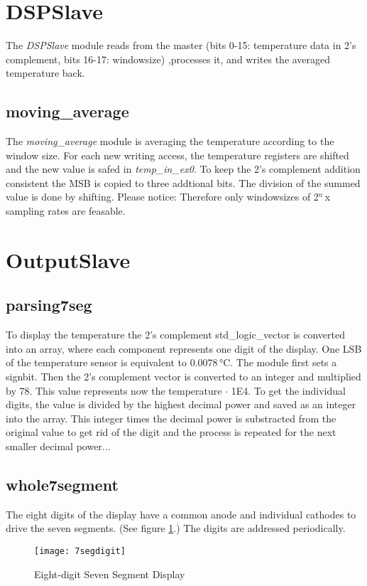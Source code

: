 \documentclass[%
	a4paper,
]
{article}
\begin{document}
\section{DSPSlave}
The \textit{DSPSlave} module reads from the master (bits 0-15: temperature data in 2's complement, bits 16-17: windowsize) ,processes it, and writes the averaged temperature back.
\subsection{moving_average}
The \textit{moving_average} module is averaging the temperature according to the window size. For each new writing access, the temperature registers are shifted and the new value is safed in \textit{temp_in_ex0}. To keep the 2's complement addition consistent the MSB is copied to three addtional bits. The division of the summed value is done by shifting. Please notice: Therefore only windowsizes of 2$^n$\,x sampling rates are feasable.



\section{OutputSlave}

\subsection{parsing7seg}
To display the temperature the 2's complement std_logic_vector is converted into an array, where each component represents one digit of the display. One LSB of the temperature sensor is equivalent to 0.0078\,°C. The module first sets a signbit. Then the 2's complement vector is converted to an integer and multiplied by 78. This value represents now the temperature $\cdot$ 1E4. To get the individual digits, the value is divided by the highest decimal power and saved as an integer into the array. This integer times the decimal power is substracted from the original value to get rid of the digit and the process is repeated for the next smaller decimal power...

\subsection{whole7segment}
The eight digits of the display have a common anode and individual cathodes to drive the seven segments. (See figure \ref{7segdigit}.) The digits are addressed periodically.

\begin{figure}[H]
\centering
\texttt{[image: 7segdigit]}
\caption{Eight-digit Seven Segment Display}
\label{7segdigit}
\end{figure}
\end{document}
